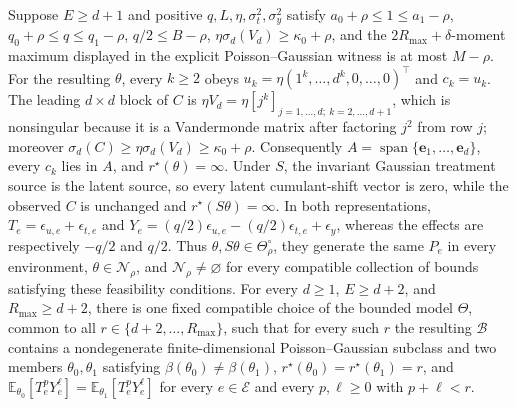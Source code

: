 Suppose \(E\ge d+1\) and positive \(q,L,\eta,\sigma_t^2,\sigma_y^2\) satisfy \(a_0+\rho\le1\le a_1-\rho\), \(q_0+\rho\le q\le q_1-\rho\), \(q/2\le B-\rho\), \(\eta\sigma_d(V_d)\ge\kappa_0+\rho\), and the \(2R_{\max}+\delta\)-moment maximum displayed in the explicit Poisson--Gaussian witness is at most \(M-\rho\).  For the resulting \(\theta\), every \(k\ge2\) obeys \(u_k=\eta(1^k,\ldots,d^k,0,\ldots,0)^\top\) and \(c_k=u_k\).  The leading \(d\times d\) block of \(C\) is \(\eta V_d=\eta[j^k]_{j=1,\ldots,d;\ k=2,\ldots,d+1}\), which is nonsingular because it is a Vandermonde matrix after factoring \(j^2\) from row \(j\); moreover \(\sigma_d(C)\ge\eta\sigma_d(V_d)\ge\kappa_0+\rho\).  Consequently \(A=\operatorname{span}\{\mathbf e_1,\ldots,\mathbf e_d\}\), every \(c_k\) lies in \(A\), and \(r^\star(\theta)=\infty\).  Under \(S\), the invariant Gaussian treatment source is the latent source, so every latent cumulant-shift vector is zero, while the observed \(C\) is unchanged and \(r^\star(S\theta)=\infty\).  In both representations, \(T_e=\epsilon_{u,e}+\epsilon_{t,e}\) and \(Y_e=(q/2)\epsilon_{u,e}-(q/2)\epsilon_{t,e}+\epsilon_y\), whereas the effects are respectively \(-q/2\) and \(q/2\).  Thus \(\theta,S\theta\in\Theta_\rho^\circ\), they generate the same \(P_e\) in every environment, \(\theta\in\mathcal N_\rho\), and \(\mathcal N_\rho\ne\varnothing\) for every compatible collection of bounds satisfying these feasibility conditions.
For every \(d\geq1\), \(E\geq d+2\), and \(R_{\max}\geq d+2\), there is one fixed compatible choice of the bounded model \(\Theta\), common to all \(r\in\{d+2,\ldots,R_{\max}\}\), such that for every such \(r\) the resulting \(\mathcal B\) contains a nondegenerate finite-dimensional Poisson--Gaussian subclass and two members \(\theta_0,\theta_1\) satisfying \(\beta(\theta_0)\neq\beta(\theta_1)\), \(r^\star(\theta_0)=r^\star(\theta_1)=r\), and \(\mathbb E_{\theta_0}[T_e^pY_e^{\ell}]=\mathbb E_{\theta_1}[T_e^pY_e^{\ell}]\) for every \(e\in\mathcal E\) and every \(p,\ell\geq0\) with \(p+\ell<r\).
